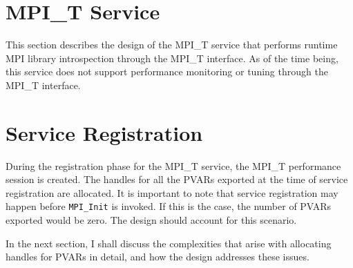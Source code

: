 \section {MPI\_T Service}
This section describes the design of the MPI\_T service that performs runtime MPI library introspection through the MPI\_T interface. As of the time being, this service does not support performance monitoring or tuning through the MPI\_T interface. 
\section{Service Registration}
During the registration phase for the MPI\_T service, the MPI\_T performance session is created. The handles for all the PVARs exported at the time of service registration are allocated. It is important to note that service registration may happen before \verb+MPI_Init+ is invoked. If this is the case, the number of PVARs exported would be zero. The design should account for this scenario.
\par In the next section, I shall discuss the complexities that arise with allocating handles for PVARs in detail, and how the design addresses these issues.
